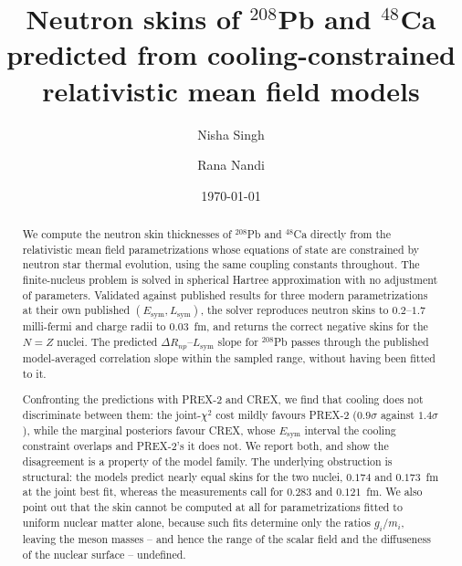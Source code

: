 \documentclass[aps,prc,twocolumn,showpacs,superscriptaddress,floatfix]{revtex4-2}
\newcommand{\Esym}{E_{\mathrm{sym}}}
\newcommand{\Lsym}{L_{\mathrm{sym}}}
\newcommand{\DRnp}{\Delta R_{np}}
\begin{document}
\title{Neutron skins of $^{208}$Pb and $^{48}$Ca predicted from
cooling-constrained relativistic mean field models}

\author{Nisha Singh}

\author{Rana Nandi}

\date{\today}

\begin{abstract}
We compute the neutron skin thicknesses of $^{208}$Pb and $^{48}$Ca directly
from the relativistic mean field parametrizations whose equations of state are
constrained by neutron star thermal evolution, using the same coupling
constants throughout. The finite-nucleus problem is solved in spherical
Hartree approximation with no adjustment of parameters. Validated against
published results for three modern parametrizations at their own published
$(\Esym,\Lsym)$, the solver reproduces neutron skins to $0.2$--$1.7$
milli-fermi and charge radii to
$0.03$~fm, and returns the correct negative skins for the $N=Z$ nuclei. The
predicted $\DRnp$--$\Lsym$ slope for $^{208}$Pb passes through the published
model-averaged correlation slope within the sampled range, without having been
fitted to it.

Confronting the predictions with PREX-2 and CREX, we find that cooling does not
discriminate between them: the joint-$\chi^2$ cost mildly favours PREX-2
($0.9\sigma$ against $1.4\sigma$), while the marginal posteriors favour CREX,
whose $\Esym$ interval the cooling constraint overlaps and PREX-2's it does not.
We report both, and show the disagreement is a property of the model family. The underlying obstruction is structural:
the models predict nearly equal skins for the two nuclei, $0.174$ and
$0.173$~fm at the joint best fit, whereas the measurements call for $0.283$ and
$0.121$~fm. We also point out that the skin cannot be computed at all for
parametrizations fitted to uniform nuclear matter alone, because such fits
determine only the ratios $g_i/m_i$, leaving the meson masses -- and hence the
range of the scalar field and the diffuseness of the nuclear surface --
undefined.
\end{abstract}
\end{document}
